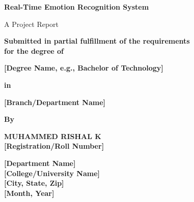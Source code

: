 \documentclass[12pt,a4paper]{report}
\begin{document}
\begin{titlepage}
    \begin{center}
        \vspace*{1cm}
            
        \Huge
        \textbf{Real-Time Emotion Recognition System}
            
        \vspace{0.5cm}
        \LARGE
        A Project Report
            
        \vspace{1.5cm}
        \Large
        \textbf{Submitted in partial fulfillment of the requirements}\\
        \textbf{for the degree of}
        
        \vspace{0.8cm}
        \Large
        \textbf{[Degree Name, e.g., Bachelor of Technology]}
        
        \vspace{0.8cm}
        \textbf{in}
        
        \vspace{0.8cm}
        \textbf{[Branch/Department Name]}
        
        \vspace{1.5cm}
        \textbf{By}
        
        \vspace{0.8cm}
        \textbf{MUHAMMED RISHAL K}\\
        \textbf{[Registration/Roll Number]}
        
        \vfill
        
        
        \vspace{0.8cm}
        
        \Large
        \textbf{[Department Name]}\\
        \textbf{[College/University Name]}\\
        \textbf{[City, State, Zip]}\\
        \textbf{[Month, Year]}
            
    \end{center}
\end{titlepage}
\end{document}
